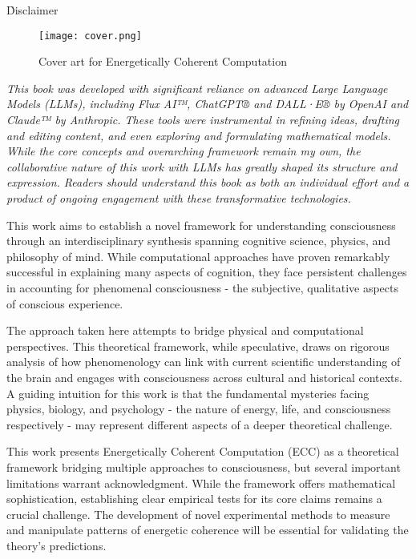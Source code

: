 \h{Disclaimer}

\vspace{1cm}

\begin{figure}[h]
    \centering
    \texttt{[image: cover.png]}

    \caption{Cover art for Energetically Coherent Computation}
\end{figure}

\vspace{1cm}

\textit{This book was developed with significant reliance on advanced Large Language Models (LLMs), including Flux AI™, ChatGPT® and DALL·E® by OpenAI and Claude™ by Anthropic. These tools were instrumental in refining ideas, drafting and editing content, and even exploring and formulating mathematical models. While the core concepts and overarching framework remain my own, the collaborative nature of this work with LLMs has greatly shaped its structure and expression. Readers should understand this book as both an individual effort and a product of ongoing engagement with these transformative technologies.}

\vspace{2cm}

This work aims to establish a novel framework for understanding consciousness through an interdisciplinary synthesis spanning cognitive science, physics, and philosophy of mind. While computational approaches have proven remarkably successful in explaining many aspects of cognition, they face persistent challenges in accounting for phenomenal consciousness - the subjective, qualitative aspects of conscious experience.

The approach taken here attempts to bridge physical and computational perspectives. This theoretical framework, while speculative, draws on rigorous analysis of how phenomenology can link with current scientific understanding of the brain and engages with consciousness across cultural and historical contexts. A guiding intuition for this work is that the fundamental mysteries facing physics, biology, and psychology - the nature of energy, life, and consciousness respectively - may represent different aspects of a deeper theoretical challenge.

This work presents Energetically Coherent Computation (ECC) as a theoretical framework bridging multiple approaches to consciousness, but several important limitations warrant acknowledgment. While the framework offers mathematical sophistication, establishing clear empirical tests for its core claims remains a crucial challenge. The development of novel experimental methods to measure and manipulate patterns of energetic coherence will be essential for validating the theory's predictions.

